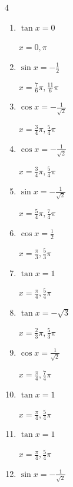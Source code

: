 \begin{multicols}{4}
\begin{enumerate}
  \item $\displaystyle \tan{x}  = 0$

        $\displaystyle x = 0 , \pi$

  \item $\displaystyle \sin{x}  = -\frac{1}{2}$

        $\displaystyle x = \frac{7}{6}\pi , \frac{11}{6}\pi$

\columnbreak %

  \item $\displaystyle \cos{x}  = -\frac{1}{\sqrt{2}}$

        $\displaystyle x = \frac{3}{4}\pi , \frac{5}{4}\pi$

  \item $\displaystyle \cos{x}  = -\frac{1}{\sqrt{2}}$

        $\displaystyle x = \frac{3}{4}\pi , \frac{5}{4}\pi$

  \item $\displaystyle \sin{x}  = -\frac{1}{\sqrt{2}}$

        $\displaystyle x = \frac{5}{4}\pi , \frac{7}{4}\pi$

  \item $\displaystyle \cos{x}  = \frac{1}{2}$

        $\displaystyle x = \frac{\pi}{3} , \frac{5}{3}\pi$

  \item $\displaystyle \tan{x}  = 1$

        $\displaystyle x = \frac{\pi}{4} , \frac{5}{4}\pi$

  \item $\displaystyle \tan{x}  = -\sqrt{3}$

        $\displaystyle x = \frac{2}{3}\pi , \frac{5}{3}\pi$

  \item $\displaystyle \cos{x}  = \frac{1}{\sqrt{2}}$

        $\displaystyle x = \frac{\pi}{4} , \frac{7}{4}\pi$

  \item $\displaystyle \tan{x}  = 1$

        $\displaystyle x = \frac{\pi}{4} , \frac{5}{4}\pi$

  \item $\displaystyle \tan{x}  = 1$

        $\displaystyle x = \frac{\pi}{4} , \frac{5}{4}\pi$

  \item $\displaystyle \sin{x}  = -\frac{1}{\sqrt{2}}$


\end{enumerate}
\end{multicols}

